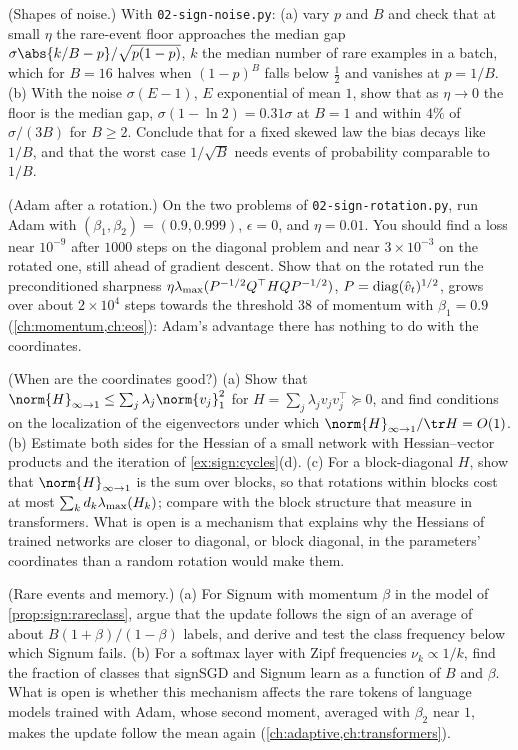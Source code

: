 \begin{refsection}
\begin{exercises}
\item \simulation (Shapes of noise.) With \texttt{02-sign-noise.py}: (a) vary $p$ and $B$ and check that at small $\eta$ the rare-event floor approaches the median gap $\sigma\abs{k/B-p}/\sqrt{p(1-p)}$, $k$ the median number of rare examples in a batch, which for $B=16$ halves when $(1-p)^B$ falls below $\frac12$ and vanishes at $p=1/B$. (b) With the noise $\sigma(E-1)$, $E$ exponential of mean $1$, show that as $\eta\to0$ the floor is the median gap, $\sigma(1-\ln2)=0.31\sigma$ at $B=1$ and within $4\%$ of $\sigma/(3B)$ for $B\ge2$. Conclude that for a fixed skewed law the bias decays like $1/B$, and that the worst case $1/\sqrt B$ needs events of probability comparable to $1/B$.

\item \simulation (Adam after a rotation.)\label{ex:sign:adamrot} On the two problems of \texttt{02-sign-rotation.py}, run Adam with $(\beta_1,\beta_2)=(0.9,0.999)$, $\epsilon=0$, and $\eta=0.01$. You should find a loss near $10^{-9}$ after $1000$ steps on the diagonal problem and near $3\times10^{-3}$ on the rotated one, still ahead of gradient descent. Show that on the rotated run the preconditioned sharpness $\eta\lambda_{\max}(P^{-1/2}Q^\top HQP^{-1/2})$, $P=\operatorname{diag}(\hat v_t)^{1/2}$, grows over about $2\times10^4$ steps towards the threshold $38$ of momentum with $\beta_1=0.9$ (\cref{ch:momentum,ch:eos}): Adam's advantage there has nothing to do with the coordinates.

\item \research (When are the coordinates good?)\label{ex:sign:basis} (a) Show that $\norm{H}_{\infty\to1}\le\sum_j\lambda_j\norm{v_j}_1^2$ for $H=\sum_j\lambda_jv_jv_j^\top\succeq0$, and find conditions on the localization of the eigenvectors under which $\norm{H}_{\infty\to1}/\tr H=O(1)$. (b) Estimate both sides for the Hessian of a small network with Hessian--vector products and the iteration of \cref{ex:sign:cycles}(d). (c) For a block-diagonal $H$, show that $\norm{H}_{\infty\to1}$ is the sum over blocks, so that rotations within blocks cost at most $\sum_kd_k\lambda_{\max}(H_k)$; compare with the block structure that \textcite{ZhangEtAl2024} measure in transformers. What is open is a mechanism that explains why the Hessians of trained networks are closer to diagonal, or block diagonal, in the parameters' coordinates than a random rotation would make them.

\item \research (Rare events and memory.)\label{ex:sign:rare} (a) For Signum with momentum $\beta$ in the model of \cref{prop:sign:rareclass}, argue that the update follows the sign of an average of about $B(1+\beta)/(1-\beta)$ labels, and derive and test the class frequency below which Signum fails. (b) For a softmax layer with Zipf frequencies $\nu_k\propto1/k$, find the fraction of classes that signSGD and Signum learn as a function of $B$ and $\beta$. What is open is whether this mechanism affects the rare tokens of language models trained with Adam, whose second moment, averaged with $\beta_2$ near $1$, makes the update follow the mean again (\cref{ch:adaptive,ch:transformers}).
\end{exercises}


\end{refsection}
